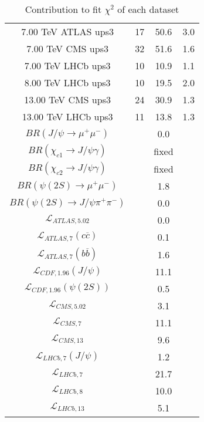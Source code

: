 \begin{table}[h!]
\begin{tabular}{c|c|c|c}
7.00 TeV ATLAS ups3 & 17 & 50.6 & 3.0 \\
7.00 TeV CMS ups3 & 32 & 51.6 & 1.6 \\
7.00 TeV LHCb ups3 & 10 & 10.9 & 1.1 \\
8.00 TeV LHCb ups3 & 10 & 19.5 & 2.0 \\
13.00 TeV CMS ups3 & 24 & 30.9 & 1.3 \\
13.00 TeV LHCb ups3 & 11 & 13.8 & 1.3 \\
\hline
$BR(J/\psi\rightarrow\mu^+\mu^-)$ &  & 0.0 &  \\
$BR(\chi_{c1}\rightarrow J/\psi\gamma)$ &  & fixed & \\
$BR(\chi_{c2}\rightarrow J/\psi\gamma)$ &  & fixed & \\
$BR(\psi(2S)\rightarrow\mu^+\mu^-)$ &  & 1.8 &  \\
$BR(\psi(2S)\rightarrow J/\psi\pi^+\pi^-)$ &  & 0.0 &  \\
$\mathcal L_{ATLAS,5.02}$ &  & 0.0 &  \\
$\mathcal L_{ATLAS,7}(c\overline c)$ &  & 0.1 &  \\
$\mathcal L_{ATLAS,7}(b\overline b)$ &  & 1.6 &  \\
$\mathcal L_{CDF,1.96}(J/\psi)$ &  & 11.1 &  \\
$\mathcal L_{CDF,1.96}(\psi(2S))$ &  & 0.5 &  \\
$\mathcal L_{CMS,5.02}$ &  & 3.1 &  \\
$\mathcal L_{CMS,7}$ &  & 11.1 &  \\
$\mathcal L_{CMS,13}$ &  & 9.6 &  \\
$\mathcal L_{LHCb,7}(J/\psi)$ &  & 1.2 &  \\
$\mathcal L_{LHCb,7}$ &  & 21.7 &  \\
$\mathcal L_{LHCb,8}$ &  & 10.0 &  \\
$\mathcal L_{LHCb,13}$ &  & 5.1 &  \\
\end{tabular}
\caption{Contribution to fit $\chi^2$ of each dataset}
\end{table}
